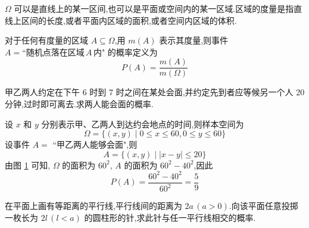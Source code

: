 \begin{note}
    \indent $\varOmega$ 可以是直线上的某一区间,也可以是平面或空间内的某一区域.区域的度量是指直线上区间的长度,或者平面内区域的面积,或者空间内区域的体积.
\end{note}

对于任何有度量的区域 $A \subseteq \varOmega$,用 $m(A)$ 表示其度量,则事件 $A = \text{``随机点落在区域}\, A \,\text{内"}$ 的概率定义为
$$
P(A)=\dfrac{m(A)}{m(\varOmega)}
$$

\begin{example}[][会面问题]
    \indent 甲乙两人约定在下午 6 时到 7 时之间在某处会面,并约定先到者应等候另一个人 20 分钟,过时即可离去.求两人能会面的概率.
\end{example}

\begin{solution}
    设 $x$ 和 $y$ 分别表示甲、乙两人到达约会地点的时间,则样本空间为
    $$
    \varOmega = \{ (x,y) \mid 0 \leqslant x \leqslant 60, 0 \leqslant y \leqslant 60 \}
    $$
    设事件 $A=$ ``甲乙两人能够会面",则
    $$
    A = \{ (x,y) \mid |x-y| \leqslant 20 \}
    $$
    由图 \ref{fig:会面问题} 可知, $\varOmega$ 的面积为 $60^2$, $A$ 的面积为 $60^2 - 40^2$,因此
    $$
    P(A) = \dfrac{60^2 - 40^2}{60^2} = \dfrac{5}{9}
    $$

    \begin{figure}[H]
        \centering


        \caption{}
        \label{fig:会面问题}
    \end{figure}
\end{solution}

\begin{example}[][蒲丰投针问题]
    \indent 在平面上画有等距离的平行线,平行线间的距离为 $2a \, (a>0)$.向该平面任意投掷一枚长为 $2l \, (l<a)$ 的圆柱形的针,求此针与任一平行线相交的概率.
\end{example}

